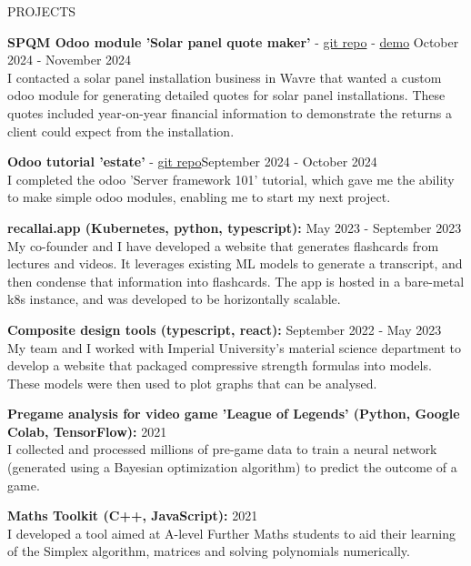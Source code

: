 \documentclass{resume} %
\begin{document}
\begin{rSection}{PROJECTS}
\vspace{-1.25em}

\item \textbf{SPQM Odoo module 'Solar panel quote maker'} - \href{https://github.com/ferdinandhubbard981/spqm}{git repo} - \href{ferdinandhubbard.com/spqm}{demo}  \hfill October 2024 - November 2024 \\
{I contacted a solar panel installation business in Wavre that wanted a custom odoo module for generating detailed quotes for solar panel installations. These quotes included year-on-year financial information to demonstrate the returns a client could expect from the installation.}

\item \textbf{Odoo tutorial 'estate'} - \href{https://github.com/ferdinandhubbard981/odoo-tutorials}{git repo}\hfill September 2024 - October 2024 \\
{I completed the odoo 'Server framework 101' tutorial, which gave me the ability to make simple odoo modules, enabling me to start my next project.}

\item \textbf{recallai.app (Kubernetes, python, typescript):} \hfill May 2023 - September 2023 \\
{My co-founder and I have developed a website that generates flashcards from lectures and videos. It leverages existing ML models to generate a transcript, and then condense that information into flashcards. The app is hosted in a bare-metal k8s instance, and was developed to be horizontally scalable.}

\item \textbf{Composite design tools (typescript, react):} \hfill September 2022 - May 2023 \\
{My team and I worked with Imperial University's material science department to develop a website that packaged compressive strength formulas into models. These models were then used to plot graphs that can be analysed.}

\item \textbf{Pregame analysis for video game 'League of Legends' (Python, Google Colab, TensorFlow):} \hfill 2021 \\
{I collected and processed millions of pre-game data to train a neural network (generated using a Bayesian optimization algorithm) to predict the outcome of a game.}%

\item \textbf{Maths Toolkit (C++, JavaScript):} \hfill 2021 \\
{I developed a tool aimed at A-level Further Maths students to aid their learning of the Simplex algorithm, matrices and solving polynomials numerically.}

\end{rSection}
\end{document}
